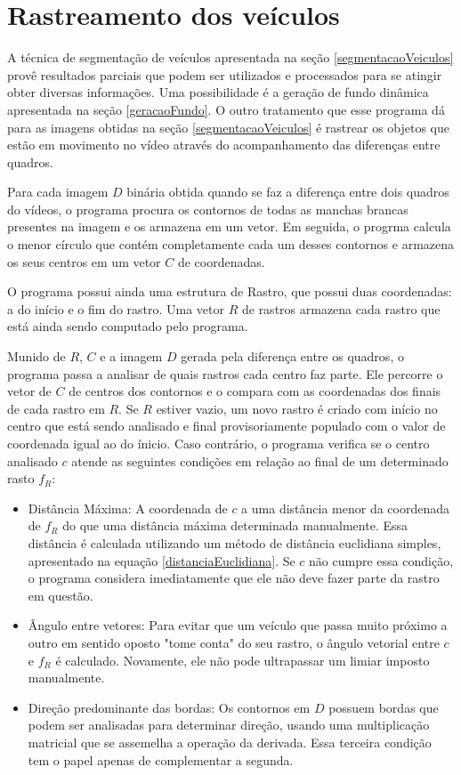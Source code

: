 \section{Rastreamento dos veículos} \label{rastreamentoVeiculos}
    
      A técnica de segmentação de veículos apresentada na seção \ref{segmentacaoVeiculos} provê resultados parciais que podem ser utilizados e processados para se atingir obter diversas informações. Uma possibilidade é a geração de fundo dinâmica apresentada na seção \ref{geracaoFundo}. O outro tratamento que esse programa dá para as imagens obtidas na seção \ref{segmentacaoVeiculos} é rastrear os objetos que estão em movimento no vídeo através do acompanhamento das diferenças entre quadros.
      
      Para cada imagem $D$ binária obtida quando se faz a diferença entre dois quadros do vídeos, o programa procura os contornos de todas as manchas brancas presentes na imagem e os armazena em um vetor. Em seguida, o progrma calcula o menor círculo que contém completamente cada um desses contornos e armazena os seus centros em um vetor $C$ de coordenadas.
      
      O programa possui ainda uma estrutura de Rastro, que possui duas coordenadas: a do início e o fim do rastro. Uma vetor $R$ de rastros armazena cada rastro que está ainda sendo computado pelo programa.
      
      Munido de $R$, $C$ e a imagem $D$ gerada pela diferença entre os quadros, o programa passa a analisar de quais rastros cada centro faz parte. Ele percorre o vetor de $C$ de centros dos contornos e o compara com as coordenadas dos finais de cada rastro em $R$. Se $R$ estiver vazio, um novo rastro é criado com início no centro que está sendo analisado e final provisoriamente populado com o valor de coordenada igual ao do ínicio. Caso contrário, o programa verifica se o centro analisado $c$ atende as seguintes condições em relação ao final de um determinado rasto $f_{R}$:
      
      \begin{itemize}
        \item Distância Máxima: A coordenada de $c$ a uma distância menor da coordenada de $f_{R}$ do que uma distância máxima determinada manualmente. Essa distância é calculada utilizando um método de distância euclidiana simples, apresentado na equação \ref{distanciaEuclidiana}. Se $c$ não cumpre essa condição, o programa considera imediatamente que ele não deve fazer parte da rastro em questão.
        \item Ângulo entre vetores: Para evitar que um veículo que passa muito próximo a outro em sentido oposto "tome conta" do seu rastro, o ângulo vetorial entre $c$ e $f_{R}$ é calculado. Novamente, ele não pode ultrapassar um limiar imposto manualmente.
        \item Direção predominante das bordas: Os contornos em $D$ possuem bordas que podem ser analisadas para determinar direção, usando uma multiplicação matricial que se assemelha a operação da derivada. Essa terceira condição tem o papel apenas de complementar a segunda.
      \end{itemize}
      
